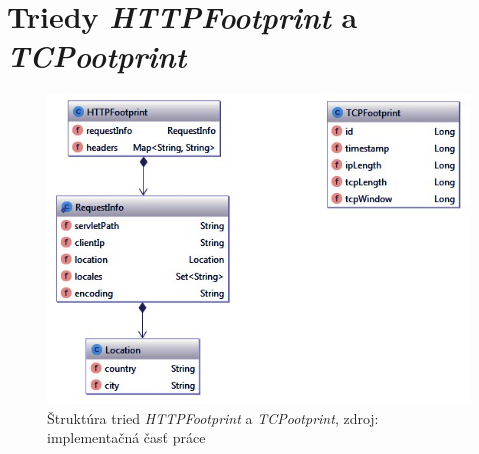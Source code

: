 \documentclass[
  printed, %
  table,   %
  lof,     %
  nolot,   %
  nocover
]{fithesis3}
\begin{document}
\chapter{Triedy \textit{HTTPFootprint} a \textit{TCPootprint}}
\label{fig:appendix-structure}
\begin{figure}[h]
  \centering
    \includegraphics[width=\textwidth]{images/appendix-structure.png}
  \caption{Štruktúra tried \textit{HTTPFootprint} a \textit{TCPootprint},
  zdroj: implementačná časť práce}
\end{figure}
\let\cleardoublepage\clearpage %
\end{document}
